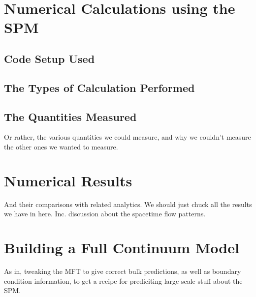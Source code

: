 \section{Numerical Calculations using the SPM}
\subsection{Code Setup Used}
\subsection{The Types of Calculation Performed}
\subsection{The Quantities Measured}
Or rather, the various quantities we could measure, and why we couldn't measure the other ones we wanted to measure.

\section{Numerical Results}
And their comparisons with related analytics. We should just chuck all the results we have in here. Inc. discussion about the spacetime flow patterns.

\section{Building a Full Continuum Model}
As in, tweaking the MFT to give correct bulk predictions, as well as boundary condition information, to get a recipe for prediciting large-scale stuff about the SPM.